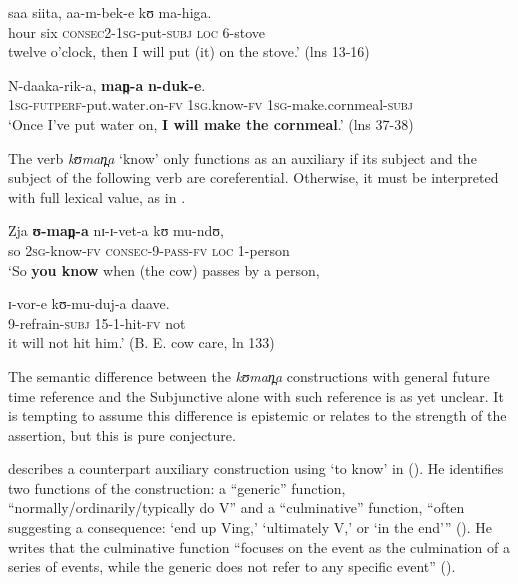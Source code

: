 \documentclass[output=paper]{langsci/langscibook}
\begin{document}
\gll saa   siita,   aa-m-bek-e       kʊ   ma-higa. \\
hour  six  \textsc{consec2-1sg}-put-\textsc{subj}  \textsc{loc}  6-stove \\
\glt twelve o'clock, then I will put (it) on the stove.’ (lns 13-16)
\z 

\ea\label{ex:sarvasy:24}
\gll N-daaka-rik-a,         \textbf{man̪-a}     \textbf{n-duk-e}. \\
\textsc{1sg-futperf}-put.water.on-\textsc{fv}  1\textsc{sg.}know-\textsc{fv}    \textsc{1sg}-make.cornmeal-\textsc{subj} \\
\glt ‘Once I've put water on, \textbf{I will make the cornmeal}.’ (lns 37-38)
\z

The verb \textit{kʊman̪a} ‘know’ only functions as an auxiliary if its subject and the subject of the following verb are coreferential. Otherwise, it must be interpreted with full lexical value, as in .

\ea\label{ex:sarvasy:25}
\gll Zja   \textbf{ʊ-man̪-a}     nɪ-ɪ-vet-a     kʊ     mu-ndʊ, \\
so  2\textsc{sg-}know\textsc{-fv}  \textsc{consec}-9-\textsc{pass}-\textsc{fv}   \textsc{loc}  1-person \\
\glt ‘So \textbf{you know} when (the cow) passes by a person,

\gll ɪ-vor-e     kʊ-mu-duj-a   daave. \\
9-refrain-\textsc{subj}  15-1-hit-\textsc{fv}  not \\
\glt it will not hit him.’ (B. E. cow care, ln 133)
\z

The semantic difference between the \textit{kʊman̪a} constructions with general future time reference and the Subjunctive alone with such reference is as yet unclear. It is tempting to assume this difference is epistemic or relates to the strength of the assertion, but this is pure conjecture.

\citet{Botne2009} describes a counterpart auxiliary construction using ‘to know’ in  (). He identifies two functions of the construction: a “generic” function, “normally/ordinarily/typically do V” and a “culminative” function, “often suggesting a consequence: ‘end up Ving,’ ‘ultimately V,’ or ‘in the end’” (\citeyear[93]{Botne2009}). He writes that the culminative function “focuses on the event as the culmination of a series of events, while the generic does not refer to any specific event” (\citeyear[95]{Botne2009}).
\end{document}
